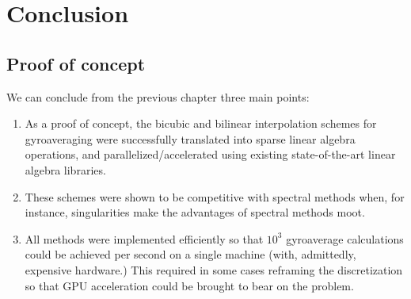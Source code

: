 \chapter{Conclusion\label{chap:Conclusion}}

\section{Proof of concept}
  We can conclude from the previous chapter three main points:
  \begin{enumerate}
  	\item As a proof of concept, the bicubic and bilinear interpolation schemes for gyroaveraging were successfully translated into sparse linear algebra operations, and parallelized/accelerated using existing state-of-the-art linear algebra libraries.
  	\item These schemes were shown to be competitive with spectral methods when, for instance, singularities make the advantages of spectral methods moot.
  	\item  All methods were implemented efficiently so that $10^3$ gyroaverage calculations could be achieved per second on a single machine (with, admittedly, expensive hardware.)  This required in some cases reframing the discretization so that GPU acceleration could be brought to bear on the problem.
  \end{enumerate}

